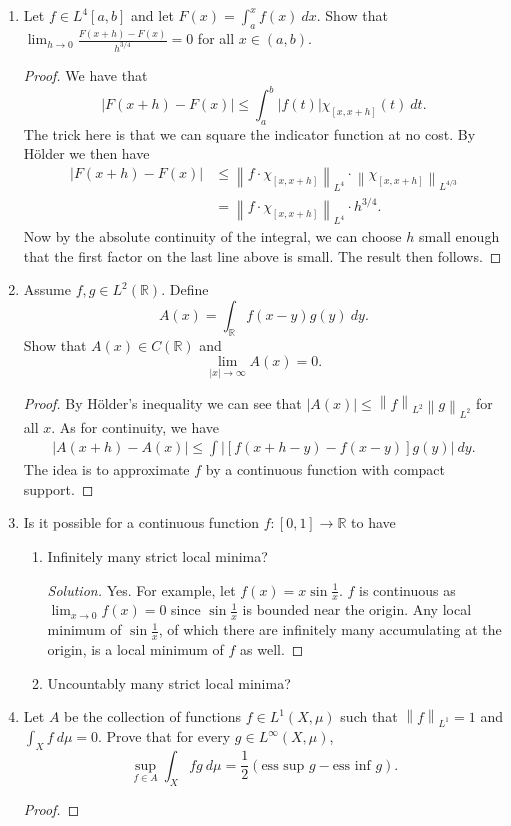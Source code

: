 \documentclass[11pt,letterpaper]{report}
\newcommand{\reals}{\mathbb{R}}
\newcommand{\Lp}[2]{\left\|{#1}\right\|_{L^{#2}}}
\newcommand{\esssup}{\text{ess sup }}
\newcommand{\essinf}{\text{ess inf }}
\newenvironment{solution}
{\begin{proof}[Solution]}
{\end{proof}}
\begin{document}
\begin{enumerate}
	\item Let $f\in L^4[a,b]$ and let $F(x) = \int_a^xf(x)\ dx$. Show that $\lim_{h\to 0}\frac{F(x+h)-F(x)}{h^{3/4}} = 0$ for all $x\in (a,b)$.
	\begin{proof}
		We have that
		\[
		|F(x+h)-F(x)| \leq \int_a^b|f(t)|\chi_{[x,x+h]}(t)\ dt.
		\]
		The trick here is that we can square the indicator function at no cost. By H\"older we then have
		\begin{align*}
			|F(x+h)-F(x)| &\leq \Lp{f\cdot \chi_{[x,x+h]}}{4}\cdot \Lp{\chi_{[x,x+h]}}{4/3}\\
			&= \Lp{f\cdot \chi_{[x,x+h]}}{4}\cdot h^{3/4}.
		\end{align*}
		Now by the absolute continuity of the integral, we can choose $h$ small enough that the first factor on the last line above is small. The result then follows.
	\end{proof}

	\item Assume $f,g\in L^2(\reals)$. Define
	\[
	A(x) = \int_\reals f(x-y)g(y)\ dy.
	\]
	Show that $A(x)\in C(\reals)$ and
	\[
	\lim_{|x|\to \infty}A(x) = 0.
	\]
	\begin{proof}
		By H\"older's inequality we can see that $|A(x)| \leq \Lp{f}{2}\Lp{g}{2}$ for all $x$. As for continuity, we have
		\begin{align*}
			|A(x+h)-A(x)| \leq \int |[f(x+h-y)-f(x-y)]g(y)|\ dy.
		\end{align*}
		The idea is to approximate $f$ by a continuous function with compact support. 
	\end{proof}

	\item Is it possible for a continuous function $f: [0,1]\to \reals$ to have
	\begin{enumerate}
		\item Infinitely many strict local minima?
		\begin{solution}
			Yes. For example, let $f(x) = x\sin\frac{1}{x}$. $f$ is continuous as $\lim_{x\to 0}f(x) = 0$ since $\sin \frac{1}{x}$ is bounded near the origin. Any local minimum of $\sin \frac{1}{x}$, of which there are infinitely many accumulating at the origin, is a local minimum of $f$ as well. 
		\end{solution}
		\item Uncountably many strict local minima?
	\end{enumerate}

	\item Let $A$ be the collection of functions $f\in L^1(X, \mu)$ such that $\Lp{f}{1}=1$ and $\int_X f\ d\mu = 0$. Prove that for every $g\in L^\infty(X, \mu)$,
	\[
	\sup_{f\in A}\int_Xfg\ d\mu = \frac{1}{2}(\esssup g - \essinf g).
	\]
	\begin{proof}
		
	\end{proof}
\end{enumerate}
\end{document}
